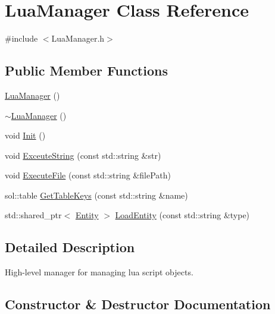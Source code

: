 \hypertarget{class_lua_manager}{}\section{Lua\+Manager Class Reference}
\label{class_lua_manager}


{\ttfamily \#include $<$Lua\+Manager.\+h$>$}

\subsection*{Public Member Functions}
\begin{DoxyCompactItemize}
\item 
\mbox{\hyperlink{class_lua_manager_a11da08140b20bfb4e77ac117a6bc7a0a}{Lua\+Manager}} ()
\item 
\mbox{\hyperlink{class_lua_manager_a26a821d05088bb1a6d7642b6312930aa}{$\sim$\+Lua\+Manager}} ()
\item 
void \mbox{\hyperlink{class_lua_manager_a839c0f1bea728a4aa055b8e0be26bc27}{Init}} ()
\item 
void \mbox{\hyperlink{class_lua_manager_aa03c69244e112bcd5377c8fe965a5136}{Exceute\+String}} (const std\+::string \&str)
\item 
void \mbox{\hyperlink{class_lua_manager_a5c770602033c62a3eba4ece231c33ed5}{Execute\+File}} (const std\+::string \&file\+Path)
\item 
sol\+::table \mbox{\hyperlink{class_lua_manager_af885a50a5fe0368b32853385342ae7e6}{Get\+Table\+Keys}} (const std\+::string \&name)
\item 
std\+::shared\+\_\+ptr$<$ \mbox{\hyperlink{class_entity}{Entity}} $>$ \mbox{\hyperlink{class_lua_manager_a04d24b48c0d51473d64a956fc800c312}{Load\+Entity}} (const std\+::string \&type)
\end{DoxyCompactItemize}


\subsection{Detailed Description}
High-\/level manager for managing lua script objects. 

\subsection{Constructor \& Destructor Documentation}
\mbox{\label{class_lua_manager_a11da08140b20bfb4e77ac117a6bc7a0a}} 
